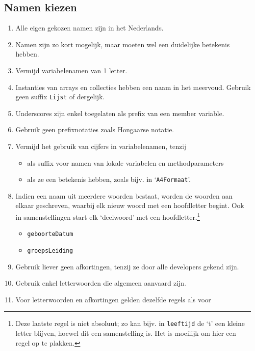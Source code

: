 \documentclass[a4paper,11pt]{article}
\begin{document}
\subsection{Namen kiezen}

\begin{enumerate}[resume]
\item Alle eigen gekozen namen zijn in het Nederlands. 
\item Namen zijn zo kort mogelijk, maar moeten wel een duidelijke
betekenis hebben.
\item Vermijd variabelenamen van 1 letter.
\item Instanties van arrays en collecties hebben een naam in het meervoud.  Gebruik geen
suffix \lstinline !Lijst! of dergelijk.
\item Underscores zijn enkel toegelaten als prefix van een member
variable.
\item Gebruik geen prefixnotaties zoals Hongaarse notatie.
\item Vermijd het gebruik van cijfers in variabelenamen, tenzij
\begin{itemize}
\item als suffix voor namen van lokale variabelen
en methodparameters
\item als ze een betekenis hebben, zoals bijv. in `\lstinline !A4Formaat!'.
\end{itemize}
\item Indien een naam uit meerdere woorden bestaat, worden de woorden aan elkaar geschreven,
waarbij elk nieuw woord met een hoofdletter begint.  Ook in samenstellingen start elk
`deelwoord' met een hoofdletter.\footnote{Deze laatste regel is niet absoluut; zo kan bijv. in
\lstinline !leeftijd! de `t' een kleine letter blijven, hoewel dit een samenstelling is.  Het is moeilijk om hier een regel op te
plakken.}
\begin{itemize}
\item \lstinline !geboorteDatum!
\item \lstinline !groepsLeiding!
\end{itemize}
\item Gebruik liever geen afkortingen, tenzij ze door alle developers
gekend zijn.
\item Gebruik enkel letterwoorden die algemeen aanvaard zijn.
\item Voor letterwoorden en afkortingen gelden dezelfde regels als voor

\end{enumerate}
\end{document}
